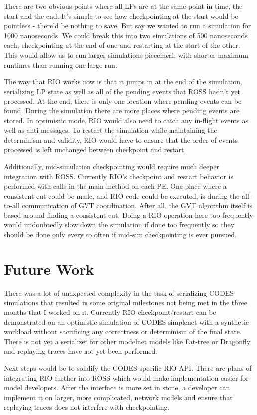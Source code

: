 \documentclass[letterpaper, 11 pt, conference]{IEEEtran}
\begin{document}
There are two obvious points where all LPs are at the same point in time, the start and the end. It's simple to see how checkpointing at the start would be pointless - there'd be nothing to save. But say we wanted to run a simulation for 1000 nanoseconds. We could break this into two simulations of 500 nanoseconds each, checkpointing at the end of one and restarting at the start of the other. This would allow us to run larger simulations piecemeal, with shorter maximum runtimes than running one large run.

The way that RIO works now is that it jumps in at the end of the simulation, serializing LP state as well as all of the pending events that ROSS hadn't yet processed. At the end, there is only one location where pending events can be found. During the simulation there are more places where pending events are stored. In optimistic mode, RIO would also need to catch any in-flight events as well as anti-messages. To restart the simulation while maintaining the determinism and validity, RIO would have to ensure that the order of events processed is left unchanged between checkpoint and restart.

Additionally, mid-simulation checkpointing would require much deeper integration with ROSS. Currently RIO's checkpoint and restart behavior is performed with calls in the main method on each PE. One place where a consistent cut could be made, and RIO code could be executed, is during the all-to-all communication of GVT coordination. After all, the GVT algorithm itself is based around finding a consistent cut. Doing a RIO operation here too frequently would undoubtedly slow down the simulation if done too frequently so they should be done only every so often if mid-sim checkpointing is ever pursued.

\section{Future Work}
There was a lot of unexpected complexity in the task of serializing CODES simulations that resulted in some original milestones not being met in the three months that I worked on it. Currently RIO checkpoint/restart can be demonstrated on an optimistic simulation of CODES simplenet with a synthetic workload without sacrificing any correctness or determinism of the final state. There is not yet a serializer for other modelnet models like Fat-tree or Dragonfly and replaying traces have not yet been performed.

Next steps would be to solidify the CODES specific RIO API. There are plans of integrating RIO further into ROSS which would make implementation easier for model developers. After the interface is more set in stone, a developer can implement it on larger, more complicated, network models and ensure that replaying traces does not interfere with checkpointing.
\end{document}
